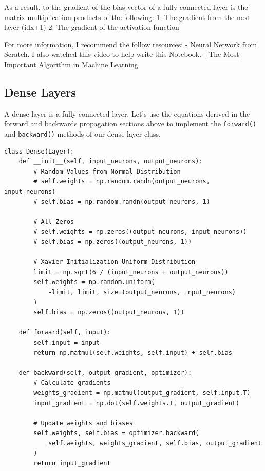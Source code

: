 \documentclass[openany]{book}
\begin{document}
As a result, to the gradient of the bias vector of a fully-connected
layer is the matrix multiplication products of the following: 1. The
gradient from the next layer (idx+1) 2. The gradient of the activation
function

    For more information, I recommend the follow resources: -
\href{https://www.youtube.com/watch?v=pauPCy_s0Ok}{Neural Network from
Scratch}. I also watched this video to help write this Notebook. -
\href{https://www.youtube.com/watch?v=SmZmBKc7Lrs}{The Most Important
Algorithm in Machine Learning}

    \subsection{Dense Layers}\label{dense-layers}

A dense layer is a fully connected layer. Let's use the equations
derived in the forward and backwards propagation sections above to
implement the \texttt{forward()} and \texttt{backward()} methods of our
dense layer class.

\begin{tcolorbox}
\tiny
\begin{verbatim}
class Dense(Layer):
    def __init__(self, input_neurons, output_neurons):
        # Random Values from Normal Distribution
        # self.weights = np.random.randn(output_neurons, input_neurons)
        # self.bias = np.random.randn(output_neurons, 1)

        # All Zeros
        # self.weights = np.zeros((output_neurons, input_neurons))
        # self.bias = np.zeros((output_neurons, 1))

        # Xavier Initialization Uniform Distribution
        limit = np.sqrt(6 / (input_neurons + output_neurons))
        self.weights = np.random.uniform(
            -limit, limit, size=(output_neurons, input_neurons)
        )
        self.bias = np.zeros((output_neurons, 1))

    def forward(self, input):
        self.input = input
        return np.matmul(self.weights, self.input) + self.bias

    def backward(self, output_gradient, optimizer):
        # Calculate gradients
        weights_gradient = np.matmul(output_gradient, self.input.T)
        input_gradient = np.dot(self.weights.T, output_gradient)

        # Update weights and biases
        self.weights, self.bias = optimizer.backward(
            self.weights, weights_gradient, self.bias, output_gradient
        )
        return input_gradient
\end{verbatim}
\end{tcolorbox}
\end{document}
